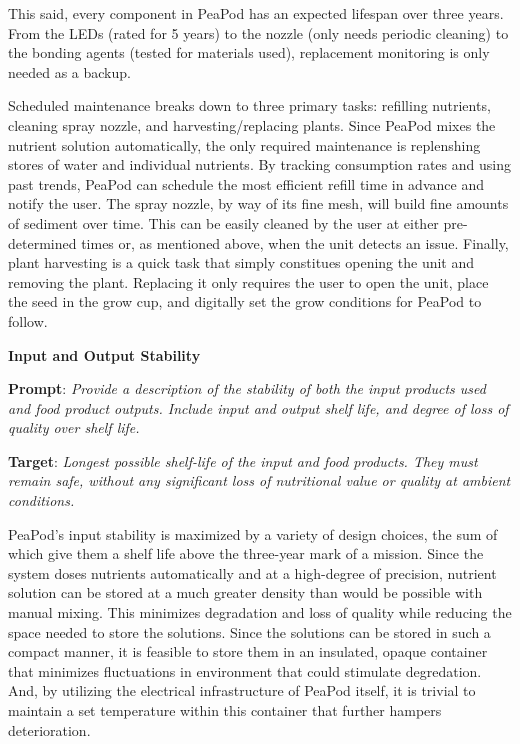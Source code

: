 \documentclass{report}
\begin{document}
This said, every component in PeaPod has an expected lifespan over three years. From the LEDs (rated for 5 years) to the nozzle (only needs periodic cleaning) to the bonding agents (tested for materials used), replacement monitoring is only needed as a backup.

Scheduled maintenance breaks down to three primary tasks: refilling nutrients, cleaning spray nozzle, and harvesting/replacing plants.
Since PeaPod mixes the nutrient solution automatically, the only required maintenance is replenshing stores of water and individual nutrients. By tracking consumption rates and using past trends, PeaPod can schedule the most efficient refill time in advance and notify the user.
The spray nozzle, by way of its fine mesh, will build fine amounts of sediment over time. This can be easily cleaned by the user at either pre-determined times or, as mentioned above, when the unit detects an issue.
Finally, plant harvesting is a quick task that simply constitues opening the unit and removing the plant. Replacing it only requires the user to open the unit, place the seed in the grow cup, and digitally set the grow conditions for PeaPod to follow.

\textbf{Input and Output Stability}
\label{sec:reliability-inputoutput}

\textbf{Prompt}: \textit{Provide a description of the stability of both the input products used and food product outputs. Include input and output shelf life, and degree of loss of quality over shelf life.}

\textbf{Target}: \textit{Longest possible shelf-life of the input and food products. They must remain safe, without any significant loss of nutritional value or quality at ambient conditions.}


PeaPod's input stability is maximized by a variety of design choices, the sum of which give them a shelf life above the three-year mark of a mission. Since the system doses nutrients automatically and at a high-degree of precision, nutrient solution can be stored at a much greater density than would be possible with manual mixing. This minimizes degradation and loss of quality while reducing the space needed to store the solutions. Since the solutions can be stored in such a compact manner, it is feasible to store them in an insulated, opaque container that minimizes fluctuations in environment that could stimulate degredation. And, by utilizing the electrical infrastructure of PeaPod itself, it is trivial to maintain a set temperature within this container that further hampers deterioration.
\end{document}
